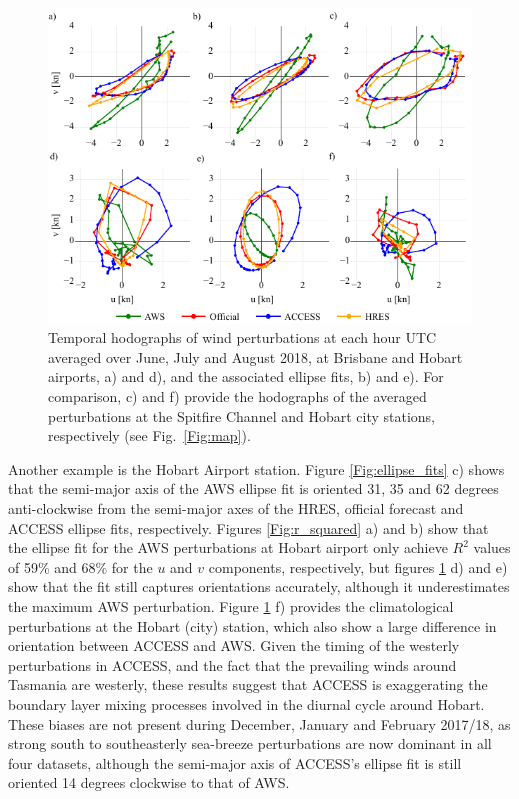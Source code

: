 \documentclass{ametsoc}
\begin{document}
\begin{figure}
\centering
\includegraphics[width=39pc]{ellipse_hodo.pdf}
\caption{Temporal hodographs of wind perturbations at each hour UTC averaged over June, July and August 2018, at Brisbane and Hobart airports, a) and d), and the associated ellipse fits, b) and e). For comparison, c) and f) provide the hodographs of the averaged perturbations at the Spitfire Channel and Hobart city stations, respectively (see Fig.~\ref{Fig:map}).}
\label{Fig:ellipse_hodo}
\end{figure}

Another example is the Hobart Airport station. Figure \ref{Fig:ellipse_fits} c) shows that the semi-major axis of the AWS ellipse fit is oriented 31, 35 and 62 degrees anti-clockwise from the semi-major axes of the HRES, official forecast and ACCESS ellipse fits, respectively. Figures \ref{Fig:r_squared} a) and b) show that the ellipse fit for the AWS perturbations at Hobart airport only achieve $R^2$ values of 59\% and 68\% for the $u$ and $v$ components, respectively, but figures \ref{Fig:ellipse_hodo} d) and e) show that the fit still captures orientations accurately, although it underestimates the maximum AWS perturbation. Figure \ref{Fig:ellipse_hodo} f) provides the climatological perturbations at the Hobart (city) station, which also show a large difference in orientation between ACCESS and AWS. Given the timing of the westerly perturbations in ACCESS, and the fact that the prevailing winds around Tasmania are westerly, these results suggest that ACCESS is exaggerating the boundary layer mixing processes involved in the diurnal cycle around Hobart. These biases are not present during December, January and February 2017/18, as strong south to southeasterly sea-breeze perturbations are now dominant in all four datasets, although the semi-major axis of ACCESS's ellipse fit is still oriented 14 degrees clockwise to that of AWS. 
\end{document}
